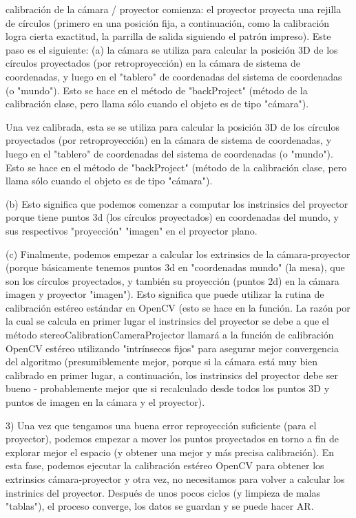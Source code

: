 calibración de la cámara / proyector comienza: el proyector proyecta una rejilla de círculos (primero en una posición fija, a continuación, como la calibración logra cierta exactitud, la parrilla de salida siguiendo el patrón impreso). Este paso es el siguiente: (a) la cámara se utiliza para calcular la posición 3D de los círculos proyectados (por retroproyección) en la cámara de sistema de coordenadas, y luego en el "tablero" de coordenadas del sistema de coordenadas (o "mundo"). Esto se hace en el método de "backProject" (método de la calibración clase, pero llama sólo cuando el objeto es de tipo "cámara"). 

Una vez calibrada, esta se se utiliza para calcular la posición 3D de los círculos proyectados (por retroproyección) en la cámara de sistema de coordenadas, y luego en el "tablero" de coordenadas del sistema de coordenadas (o "mundo"). Esto se hace en el método de "backProject" (método de la calibración clase, pero llama sólo cuando el objeto es de tipo "cámara"). 

(b) Esto significa que podemos comenzar a computar los instrinsics del proyector porque tiene puntos 3d (los círculos proyectados) en coordenadas del mundo, y sus respectivos "proyección" "imagen" en el proyector plano. 

(c) Finalmente, podemos empezar a calcular los extrinsics de la cámara-proyector (porque básicamente tenemos puntos 3d en "coordenadas mundo" (la mesa), que son los círculos proyectados, y también su proyección (puntos 2d) en la cámara imagen y proyector "imagen"). Esto significa que puede utilizar la rutina de calibración estéreo estándar en OpenCV (esto se hace en la función. La razón por la cual se calcula en primer lugar el instrinsics del proyector se debe a que el método stereoCalibrationCameraProjector llamará a la función de calibración OpenCV estéreo utilizando "intrínsecos fijos" para asegurar mejor convergencia del algoritmo (presumiblemente mejor, porque si la cámara está muy bien calibrado en primer lugar, a continuación, los instrinsics del proyector debe ser bueno - probablemente mejor que si recalculado desde todos los puntos 3D y puntos de imagen en la cámara y el proyector). 

3) Una vez que tengamos una buena error reproyección suficiente (para el proyector), podemos empezar a mover los puntos proyectados en torno a fin de explorar mejor el espacio (y obtener una mejor y más precisa calibración). En esta fase, podemos ejecutar la calibración estéreo OpenCV para obtener los extrinsics cámara-proyector y otra vez, no necesitamos para volver a calcular los instrinics del proyector. Después de unos pocos ciclos (y limpieza de malas "tablas"), el proceso converge, los datos se guardan y se puede hacer AR. 





